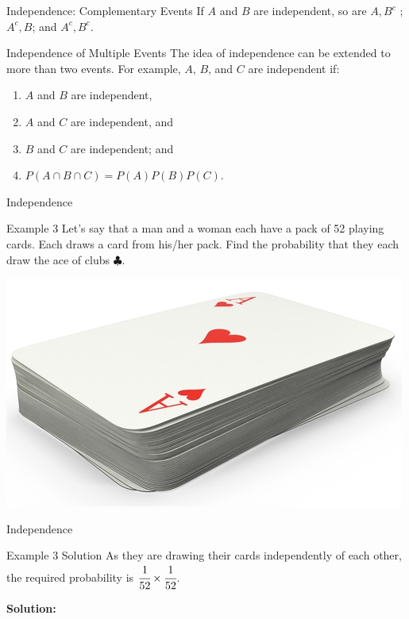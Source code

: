 \documentclass[aspectratio=169,xcolor=dvipsnames,svgnames,x11names,fleqn]{beamer}
\newcommand{\showanswers}{yes}
\begin{document}
    \begin{frame}[containsverbatim]{Independence: Complementary Events}
        \Large
        If $A$ and $B$ are independent, so are $A, B^c$ ; $A^c, B$; and $A^c, B^c$.
        
    \end{frame}
    
    \begin{frame}[containsverbatim]{Independence of Multiple Events}
        The idea of independence can be extended to more than two events. For example, $A$, $B$, and $C$ are independent if:
            \begin{enumerate}
                \item $A$ and $B$ are independent,
                \item $A$ and $C$ are independent, and  
                \item $B$ and $C$ are independent; and 
                \item $P(A \cap B \cap C) = P(A)P(B)P(C)$.
            \end{enumerate}
      
    \end{frame}
    
    
    
    \begin{frame}[containsverbatim]{Independence}

        \begin{exampleblock}{Example 3}
            Let's say that a man and a woman each have a pack of 52 playing cards. Each draws a card from his/her pack. Find the probability that they each draw the ace of clubs $\clubsuit$.
        \end{exampleblock}
        \begin{center}
            \includegraphics[width=0.3\linewidth]{figures/deck_of_cards.jpg}
        \end{center}
        \end{frame}
    
    
    \begin{frame}[containsverbatim]{Independence}
    
        \ifthenelse{\equal{\showanswers}{yes}}
        {
        \begin{examplesolution}{Example 3 Solution}
           As they are drawing their cards independently of each other, the required probability is $\cfrac{1}{52} \times \cfrac{1}{52}$.
        \end{examplesolution}
        }
        {
            \textbf{Solution:} \color{LightGray}{Blank space for calculation}
        }
    \end{frame}
    
\end{document}
